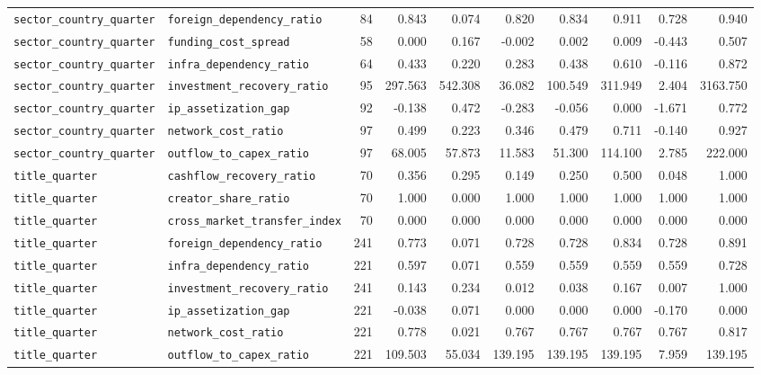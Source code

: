 \documentclass[11pt,a4paper]{report}
\begin{document}
\begin{landscape}
\begin{longtable}{@{}llrrrrrrrr@{}}
\texttt{sector\_country\_quarter} & \texttt{foreign\_dependency\_ratio} & 84 & 0.843 & 0.074 & 0.820 & 0.834 & 0.911 & 0.728 & 0.940 \\
\texttt{sector\_country\_quarter} & \texttt{funding\_cost\_spread} & 58 & 0.000 & 0.167 & -0.002 & 0.002 & 0.009 & -0.443 & 0.507 \\
\texttt{sector\_country\_quarter} & \texttt{infra\_dependency\_ratio} & 64 & 0.433 & 0.220 & 0.283 & 0.438 & 0.610 & -0.116 & 0.872 \\
\texttt{sector\_country\_quarter} & \texttt{investment\_recovery\_ratio} & 95 & 297.563 & 542.308 & 36.082 & 100.549 & 311.949 & 2.404 & 3163.750 \\
\texttt{sector\_country\_quarter} & \texttt{ip\_assetization\_gap} & 92 & -0.138 & 0.472 & -0.283 & -0.056 & 0.000 & -1.671 & 0.772 \\
\texttt{sector\_country\_quarter} & \texttt{network\_cost\_ratio} & 97 & 0.499 & 0.223 & 0.346 & 0.479 & 0.711 & -0.140 & 0.927 \\
\texttt{sector\_country\_quarter} & \texttt{outflow\_to\_capex\_ratio} & 97 & 68.005 & 57.873 & 11.583 & 51.300 & 114.100 & 2.785 & 222.000 \\
\texttt{title\_quarter} & \texttt{cashflow\_recovery\_ratio} & 70 & 0.356 & 0.295 & 0.149 & 0.250 & 0.500 & 0.048 & 1.000 \\
\texttt{title\_quarter} & \texttt{creator\_share\_ratio} & 70 & 1.000 & 0.000 & 1.000 & 1.000 & 1.000 & 1.000 & 1.000 \\
\texttt{title\_quarter} & \nolinkurl{cross_market_transfer_index} & 70 & 0.000 & 0.000 & 0.000 & 0.000 & 0.000 & 0.000 & 0.000 \\
\texttt{title\_quarter} & \texttt{foreign\_dependency\_ratio} & 241 & 0.773 & 0.071 & 0.728 & 0.728 & 0.834 & 0.728 & 0.891 \\
\texttt{title\_quarter} & \texttt{infra\_dependency\_ratio} & 221 & 0.597 & 0.071 & 0.559 & 0.559 & 0.559 & 0.559 & 0.728 \\
\texttt{title\_quarter} & \texttt{investment\_recovery\_ratio} & 241 & 0.143 & 0.234 & 0.012 & 0.038 & 0.167 & 0.007 & 1.000 \\
\texttt{title\_quarter} & \texttt{ip\_assetization\_gap} & 221 & -0.038 & 0.071 & 0.000 & 0.000 & 0.000 & -0.170 & 0.000 \\
\texttt{title\_quarter} & \texttt{network\_cost\_ratio} & 221 & 0.778 & 0.021 & 0.767 & 0.767 & 0.767 & 0.767 & 0.817 \\
\texttt{title\_quarter} & \texttt{outflow\_to\_capex\_ratio} & 221 & 109.503 & 55.034 & 139.195 & 139.195 & 139.195 & 7.959 & 139.195 \\
\bottomrule
\end{longtable}
\normalsize
\end{landscape}
\end{document}

